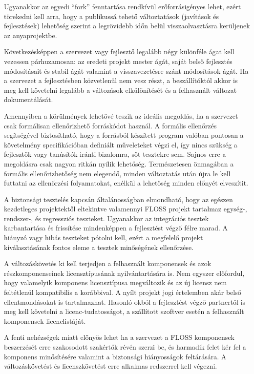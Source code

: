 \documentclass[12pt,magyar,a4paper,oneside]{scrreprt}
\begin{document}
Ugyanakkor az egyedi ``fork'' fenntartása rendkívül erőforrásigényes
lehet, ezért törekedni kell arra, hogy a publikussá tehető változtatások
(javítások és fejlesztések) lehetőség szerint a legrövidebb időn belül
visszaolvasztásra kerüljenek az anyaprojektbe.

Következésképpen a szervezet vagy fejlesztő legalább négy különféle ágat
kell vezessen párhuzamosan: az eredeti projekt mester ágát, saját belső
fejlesztés módosításait és stabil ágát valamint a visszavezetésre szánt
módosítások ágát. Ha a szervezet a fejlesztésben közvetlenül nem vesz
részt, a beszállítóktól akkor is meg kell követelni legalább a
változások elkülönítését és a felhasznált változat dokumentálását.

Amennyiben a körülmények lehetővé teszik az ideális megoldás, ha a
szervezet csak formálisan ellenőrizhető forráskódot használ. A formális
ellenőrzés segítségével biztosítható, hogy a forrásból készített program
valóban pontosan a követelmény specifikációban definiált műveleteket
végzi el, így nincs szükség a fejlesztők vagy tanúsítók iránti
bizalomra, sőt tesztekre sem. Sajnos erre a megoldásra csak nagyon
ritkán nyílik lehetőség. Természetesen önmagában a formális
ellenőrizhetőség nem elegendő, minden változtatás után újra le kell
futtatni az ellenőrzési folyamatokat, enélkül a lehetőség minden előnyét
elveszítit.

A biztonsági tesztelés kapcsán általánosságban elmondható, hogy az
egészen kezdetleges projektektől eltekintve valamennyi FLOSS projekt
tartalmaz egység-, rendszer-, és regressziós teszteket. Ugyanakkor az
integrációs tesztek karbantartása és frissítése mindenképpen a
fejlesztést végző félre marad. A hiányzó vagy hibás teszteket pótolni
kell, ezért a megfelelő projekt kiválasztásának fontos eleme a tesztek
minőségének ellenőrzése.

A változáskövetés ki kell terjedjen a felhasznált komponensek és azok
részkomponenseinek licensztípusának nyilvántartására is. Nem egyszer
előfordul, hogy valamelyik komponens licensztípusa megváltozik és az új
licensz nem feltétlenül kompatibilis a korábbival. A nyílt projekt jogi
értelemben akár belső ellentmondásokat is tartalmazhat. Hasonló okból a
fejlesztést végző partnertől is meg kell követelni a
licenc-tudatosságot, a szállított szoftver esetén a felhasznált
komponensek licenclistáját.

A fenti nehézségek miatt előnyös lehet ha a szervezet a FLOSS
komponensek beszerzését erre szakosodott szakértők révén szerzi be, és
harmadik felet kér fel a komponens minősítésére valamint a biztonsági
hiányosságok feltárására. A változáskövetést és licenszkövetést erre
alkalmas redszerrel kell végezni.
\end{document}
